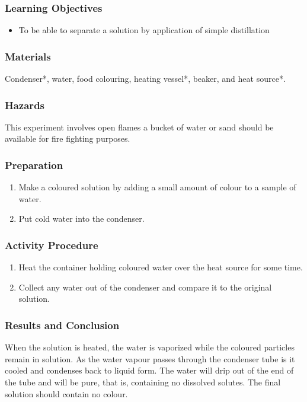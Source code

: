 \subsubsection*{Learning Objectives}
\begin{itemize}
\item{To be able to separate a solution by application of simple distillation}
\end{itemize}

\subsubsection*{Materials}
Condenser*, water, food colouring, heating vessel*, beaker, and heat source*.
\subsubsection*{Hazards}
This experiment involves open flames a bucket of water or sand should be available for fire fighting purposes.


\subsubsection*{Preparation}
\begin{enumerate}
\item{Make a coloured solution by adding a small amount of colour to a sample of water.}
\item{Put cold water into the condenser.}
\end{enumerate}

\subsubsection*{Activity Procedure}
\begin{enumerate}
\item{Heat the container holding coloured water over the heat source for some time.}
\item{Collect any water out of the condenser and compare it to the original solution.}
\end{enumerate}

\subsubsection*{Results and Conclusion}
When the solution is heated, the water is vaporized while the coloured particles remain in solution. As the water vapour passes through the condenser tube is it cooled and condenses back to liquid form. The water will drip out of the end of the tube and will be pure, that is, containing no dissolved solutes. The final solution should contain no colour.

